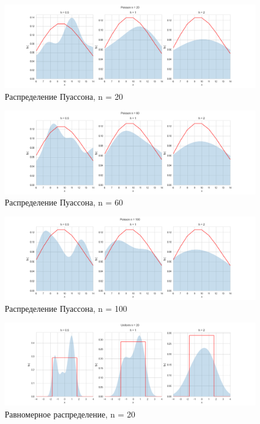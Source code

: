 \documentclass[../main.tex]{subfiles}
\begin{document}
    \begin{figure}[H]
        \centering
        \includegraphics[scale=0.5]{figures/PoissonNuclear20.png}
        \caption{Распределение Пуассона, n = 20}
        \label{fig:normal}
    \end{figure}
    
    \begin{figure}[H]
        \centering
        \includegraphics[scale=0.5]{figures/PoissonNuclear60.png}
        \caption{Распределение Пуассона, n = 60}
        \label{fig:normal}
    \end{figure}
    
    \begin{figure}[H]
        \centering
        \includegraphics[scale=0.5]{figures/PoissonNuclear100.png}
        \caption{Распределение Пуассона, n = 100}
        \label{fig:normal}
    \end{figure}
    
    \begin{figure}[H]
        \centering
        \includegraphics[scale=0.5]{figures/UniformNuclear20.png}
        \caption{Равномерное распределение, n = 20}
        \label{fig:normal}
    \end{figure}
    
\end{document}
